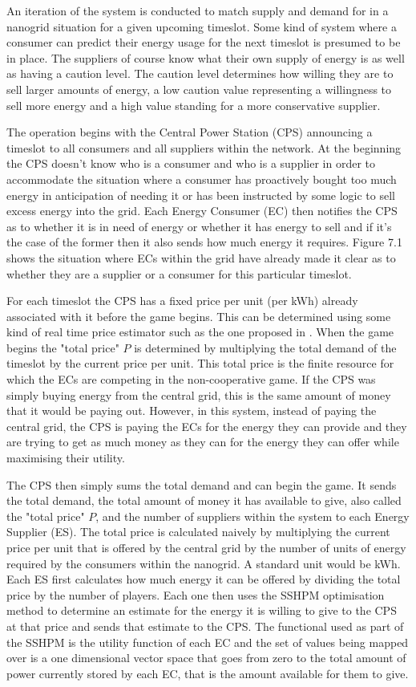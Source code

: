 \documentclass[a4paper, notitlepage]{report}
\begin{document}
An iteration of the system is conducted to match supply and demand for in a
nanogrid situation for a given upcoming timeslot. Some kind of system where a
consumer can predict their energy usage for the next timeslot is presumed to be
in place. The suppliers of course know what their own supply of energy is as
well as having a caution level. The caution level determines how
willing they are to sell larger amounts of energy, a low caution value
representing a willingness to sell more energy and a high value standing for a
more conservative supplier.

The operation begins with the Central Power Station (CPS) announcing a timeslot
to all consumers and all suppliers within the network. At the beginning the CPS
doesn't know who is a consumer and who is a supplier in order to accommodate the
situation where a consumer has proactively bought too much energy in
anticipation of needing it or has been instructed by some logic to sell excess
energy into the grid. Each Energy Consumer (EC) then notifies the CPS as to
whether it is in need of energy or whether it has energy to sell and if it's the
case of the former then it also sends how much energy it requires. Figure 7.1
shows the situation where ECs within the grid have already made it clear as to
whether they are a supplier or a consumer for this particular timeslot.

For each timeslot the CPS has a fixed price per unit (per kWh) already associated with it
before the game begins. This can be determined using some kind of real time
price estimator such as the one proposed in \cite{yun2008rbf}. When the game
begins the "total price" \(P\) is determined by multiplying the total demand of
the timeslot by the current price per unit. This total price is the finite
resource for which the ECs are competing in the non-cooperative game. If the CPS
was simply buying energy from the central grid, this is the same amount of money
that it would be paying out. However, in this system, instead of paying the
central grid, the CPS is paying the ECs for the energy they can provide and they
are trying to get as much money as they can for the energy they can offer while
maximising their utility.

The CPS then simply sums the total demand and can begin the game. It sends the
total demand, the total amount of money it has available to give, also called
the "total price" \(P\), and the number of suppliers within the system to each
Energy Supplier (ES). The total price is calculated naively by multiplying the
current price per unit that is offered by the central grid by the number of
units of energy required by the consumers within the nanogrid. A standard unit
would be kWh. Each ES first calculates how much energy it can be offered by
dividing the total price by the number of players. Each one then uses the SSHPM
optimisation method to determine an estimate for the energy it is willing to
give to the CPS at that price and sends that estimate to the CPS. The functional
used as part of the SSHPM is the utility function of each EC and the set of
values being mapped over is a one dimensional vector space that goes from zero
to the total amount of power currently stored by each EC, that is the amount
available for them to give.
\end{document}
